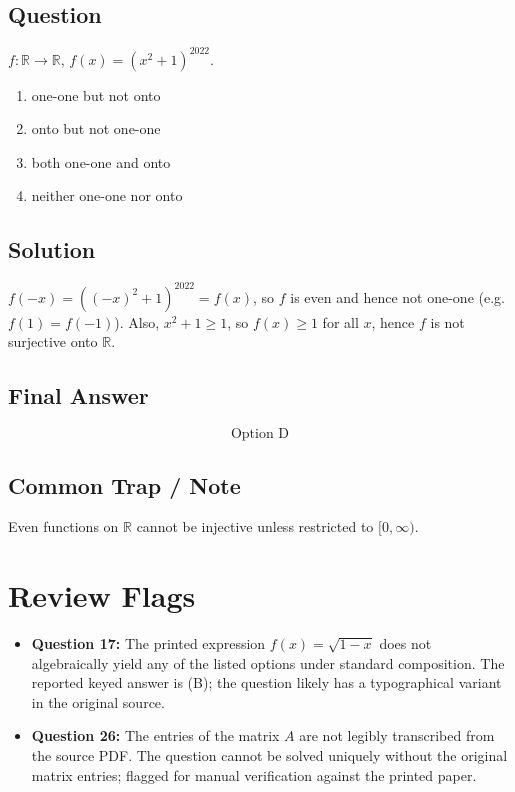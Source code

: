 \documentclass[11pt]{article}
\begin{document}
\subsection*{Question}
$f : \mathbb R \to \mathbb R$, $f(x) = (x^2 + 1)^{2022}$.
\begin{enumerate}[label=(\Alph*)]
\item one-one but not onto
\item onto but not one-one
\item both one-one and onto
\item neither one-one nor onto
\end{enumerate}

\subsection*{Solution}
$f(-x) = ((-x)^2 + 1)^{2022} = f(x)$, so $f$ is even and hence not one-one (e.g.\ $f(1)=f(-1)$).
Also, $x^2 + 1 \geq 1$, so $f(x) \geq 1$ for all $x$, hence $f$ is not surjective onto $\mathbb R$.

\subsection*{Final Answer}
\[
\boxed{\text{Option D}}
\]

\subsection*{Common Trap / Note}
Even functions on $\mathbb R$ cannot be injective unless restricted to $[0,\infty)$.

\section*{Review Flags}

\begin{itemize}
\item \textbf{Question 17:} The printed expression $f(x) = \sqrt{1-x}$ does not algebraically
yield any of the listed options under standard composition. The reported keyed answer is (B);
the question likely has a typographical variant in the original source.
\item \textbf{Question 26:} The entries of the matrix $A$ are not legibly transcribed from the
source PDF. The question cannot be solved uniquely without the original matrix entries; flagged
for manual verification against the printed paper.
\end{itemize}
\end{document}
